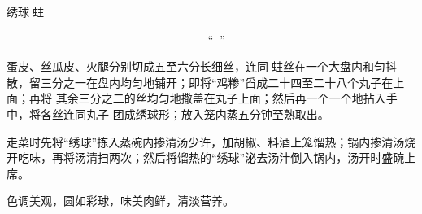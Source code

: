 %
%
%
%
%
%
%
\begin{recipe}{绣球𧎼蛀}

\ingredients


\preparation

\step 𧎼蛀抠去玉带，淘洗干净，掺清水上笼蒸𤆵，取出挤干水晾冷，搓散成丝；鸡脯、
肥膘分别砸茸；鸡蛋清调匀，加清水、豆粉、味精、盐搅成“鸡糁”；用鸡蛋一个摊成蛋
皮。

\step 蛋皮、丝瓜皮、火腿分别切成五至六分长细丝，连同𧎼蛀丝在一个大盘内和匀抖
散，留三分之一在盘内均匀地铺开；即将“鸡糁”舀成二十四至二十八个丸子在上面；再将
其余三分之二的丝均匀地撒盖在丸子上面；然后再一个一个地拈入手中，将各丝连同丸子
团成绣球形；放入笼内蒸五分钟至熟取出。

\step 走菜时先将“绣球”拣入蒸碗内掺清汤少许，加胡椒、料酒上笼馏热；锅内掺清汤烧
开吃味，再将汤清扫两次；然后将馏热的“绣球”泌去汤汁倒入锅内，汤开时盛碗上席。

\features

色调美观，圆如彩球，味美肉鲜，清淡营养。

\end{recipe}

